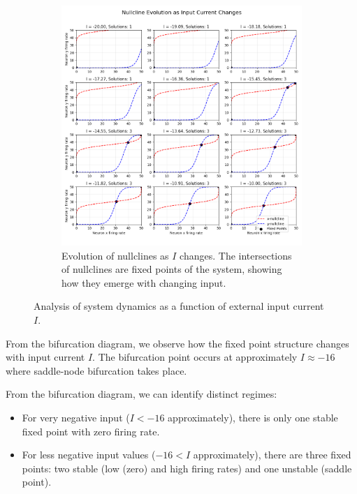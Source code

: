 \documentclass{article}
\begin{document}
\begin{figure}[H]
\begin{subfigure}{0.48\textwidth}
        \includegraphics[width=\textwidth]{nullcline_evolution_2.png}
        \caption{Evolution of nullclines as $I$ changes. The intersections of nullclines are fixed points of the system, showing how they emerge with changing input.}
        \label{fig:nullcline_evolution}
    \end{subfigure}
    \caption{Analysis of system dynamics as a function of external input current $I$.}
    \label{fig:bifurcation_analysis_combined}
\end{figure}

\bigskip
From the bifurcation diagram, we observe how the fixed point structure changes with input current $I$. The bifurcation point occurs at approximately $I \approx -16$ where saddle-node bifurcation takes place.


From the bifurcation diagram, we can identify distinct regimes:
\begin{itemize}
    \item For very negative input ($I < -16$ approximately), there is only one stable fixed point with zero firing rate.
    \item For less negative input values ($-16 < I $ approximately), there are three fixed points: two stable (low (zero) and high firing rates) and one unstable (saddle point).

\end{itemize}
\end{document}
